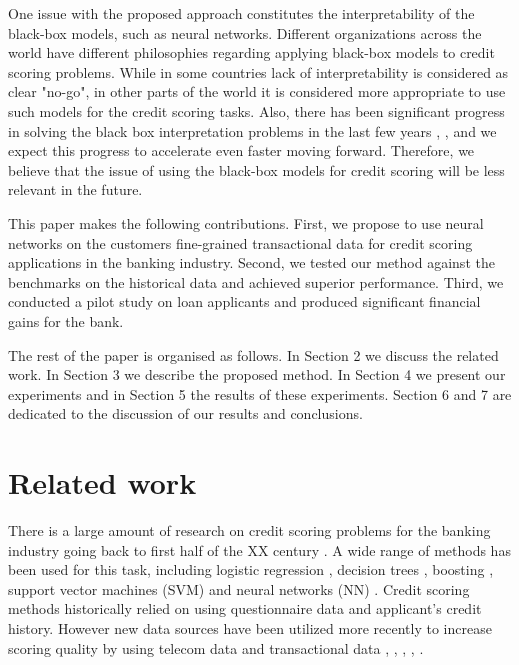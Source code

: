 \documentclass[sigconf]{acmart}
\begin{document}
One issue with the proposed approach constitutes the interpretability of the black-box models, such as neural networks.
Different organizations across the world have different philosophies regarding applying black-box models to credit scoring problems. While in some countries lack of interpretability is considered as clear "no-go", in other parts of the world it is considered more appropriate to use such models for the credit scoring tasks. Also, there has been significant progress in solving the black box interpretation problems in the last few years \cite{DBLP:journals/corr/ChoiBSSS16}, \cite{gupta2018lisa}, \cite{mccoy2018rnns} and we expect this progress to accelerate even faster moving forward. Therefore, we believe that the issue of using the black-box models for credit scoring will be less relevant in the future.

This paper makes the following contributions.
First, we propose to use neural networks on the customers fine-grained transactional data for credit scoring applications in the banking industry.
Second, we tested our method against the benchmarks on the historical data and achieved superior performance.
Third, we conducted a pilot study on loan applicants and produced significant financial gains for the bank.

The rest of the paper is organised as follows. In Section 2 we discuss the related work. In Section 3 we describe the proposed method. In Section 4 we present our experiments and in Section 5 the results of these experiments. Section 6 and 7 are dedicated to the discussion of our results and conclusions.

\section{Related work} \label{sec-rw}

There is a large amount of research on credit scoring problems for the banking industry going back to first half of the XX century \cite{NBERc12952}. A wide range of methods has been used for this task, including logistic regression \cite{RePEc:cup:jfinqa:v:15:y:1980:i:03:p:757-770_00}, decision trees \cite{makowski1985credit}, boosting \cite{Bastos2008CreditSW}, support vector machines (SVM) \cite{HUANG2007847} and neural networks (NN) \cite{west2000neural}. Credit scoring methods historically relied on using questionnaire data and applicant's credit history. However new data sources have been utilized more recently to increase scoring quality by using telecom data \cite{bjorkegren2017behavior} and transactional data \cite{khandani2010consumer}, \cite{bellotti2013forecasting}, \cite{KVAMME2018207}, \cite{chi2012hybrid}, \cite{RePEc}.
\end{document}
